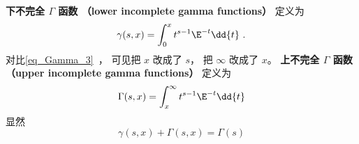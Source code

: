 
\begin{issues}
\issueDraft
\end{issues}


\textbf{下不完全 $\Gamma$ 函数 （lower incomplete gamma functions）} 定义为
\begin{equation}
\gamma(s, x) = \int_0^x t^{s-1}\E^{-t} \dd{t}~.
\end{equation}
对比\autoref{eq_Gamma_3}~， 可见把 $x$ 改成了 $s$， 把 $\infty$ 改成了 $x$。
\textbf{上不完全 $\Gamma$ 函数 （upper incomplete gamma functions）} 定义为
\begin{equation}
\Gamma(s, x) = \int_x^\infty t^{s-1}\E^{-t} \dd{t}
\end{equation}
显然
\begin{equation}
\gamma(s, x) + \Gamma(s, x) = \Gamma(s)
\end{equation}
